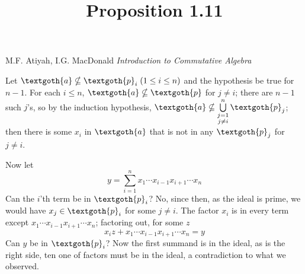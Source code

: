 \documentclass{article}
\title{Proposition 1.11}
\begin{document}
\maketitle

\begin{center}
M.F. Atiyah, I.G. MacDonald \emph{Introduction to Commutative Algebra}
\end{center}

\vspace*{10px} 

Let $ \textgoth{a} \nsubseteq \textgoth{p}_i \; (1 \leq i \leq n) $ and the hypothesis be true for $n - 1$. For each $i \leq n$, $ \textgoth{a} \nsubseteq \textgoth{p} $ for $ j \neq i $; there are $n - 1$ such $j$'s, so by the induction hypothesis, $ \textgoth{a} \nsubseteq \bigcup\limits_{\substack{ j=1 \\ j \neq i}}^n \textgoth{p}_j $; then there is some $x_i$ in $\textgoth{a}$ that is not in any $\textgoth{p}_j$ for $j \neq i$.

Now let 
\[
y = \sum_{i=1}^{n} x_1 \cdots x_{i - 1} x_{i + 1} \cdots x_n
\]
Can the $i$'th term be in $\textgoth{p}_i $? No, since then, as the ideal is prime, we would have $x_j \in \textgoth{p}_i$ for some $j \neq i$. 
The factor $x_i$ is in every term except $x_1 \cdots x_{i - 1} x_{i + 1} \cdots x_n$; factoring out, for some $z$
\[
x_i z + x_1 \cdots x_{i - 1} x_{i + 1} \cdots x_n = y   
\]
Can $y$ be in $\textgoth{p}_i $? Now the first summand is in the ideal, as is the right side, ten one of factors must be in the ideal, a contradiction to what we observed.
\end{document}

